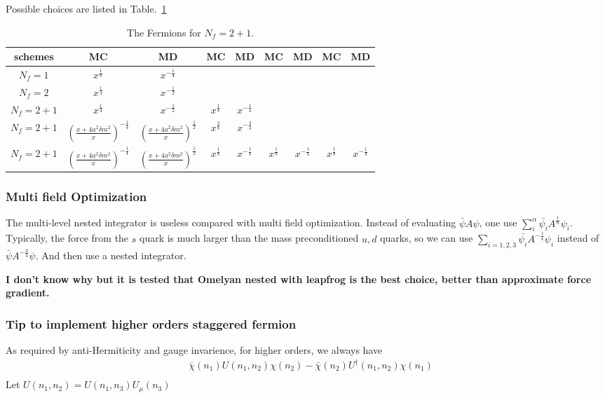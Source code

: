 Possible choices are listed in Table.~\ref{table:nf2p1staggered}
\begin{table}[ht]
\begin{tabular}{ c || c c | c c | c c| c c}
  schemes & MC & MD & MC & MD & MC & MD & MC & MD \\
  \hline
  $N_f=1$   & $x^{\frac{1}{8}}$  & $x^{-\frac{1}{4}}$ & & & & & & \\
  $N_f=2$   & $x^{\frac{1}{4}}$  & $x^{-\frac{1}{2}}$ & & & & & & \\
  \hline  
  $N_f=2+1$ & $x^{\frac{1}{4}}$  & $x^{-\frac{1}{2}}$ & $x^{\frac{1}{8}}$ & $x^{-\frac{1}{4}}$ & & & & \\
  $N_f=2+1$ & $\left(\frac{x+4a^2\delta m^2}{x}\right)^{-\frac{1}{4}}$  & $\left(\frac{x+4a^2\delta m^2}{x}\right)^{\frac{1}{2}}$ & $x^{\frac{3}{8}}$ & $x^{-\frac{3}{4}}$ & & & & \\
  $N_f=2+1$ & $\left(\frac{x+4a^2\delta m^2}{x}\right)^{-\frac{1}{4}}$  & $\left(\frac{x+4a^2\delta m^2}{x}\right)^{\frac{1}{2}}$ & $x^{\frac{1}{8}}$ & $x^{-\frac{1}{4}}$ & $x^{\frac{1}{8}}$ & $x^{-\frac{1}{4}}$ & $x^{\frac{1}{8}}$ & $x^{-\frac{1}{4}}$ \\
  \hline
\end{tabular}
\caption{The Fermions for $N_f=2+1$.}
\label{table:nf2p1staggered}
\end{table}

\subsubsection{\label{sec:multifieldOptimization}Multi field Optimization}

The multi-level nested integrator is useless compared with multi field optimization. Instead of evaluating $\bar{\psi} A \psi$, one use $\sum _i^{\alpha} \bar{\psi _i} A^{\frac{1}{\alpha}} \psi _i$. Typically, the force from the $s$ quark is much larger than the mass preconditioned $u,d$ quarks, so we can use $\sum _{i=1,2,3} \bar{\psi _i} A^{-\frac{1}{4}} \psi _i$ instead of $\bar{\psi} A^{-\frac{3}{4}} \psi$. And then use a nested integrator.

\textbf{\textcolor[rgb]{0,0,1}{I don't know why but it is tested that Omelyan nested with leapfrog is the best choice, better than approximate force gradient.}}

\subsubsection{\label{sec:TipToImplementHigherOrdersStaggeredFermion}Tip to implement higher orders staggered fermion}

As required by anti-Hermiticity and gauge invarience, for higher orders, we always have
\begin{equation}
\begin{split}
&\bar{\chi}(n_1)U(n_1,n_2)\chi (n_2) - \bar{\chi}(n_2)U^{\dagger}(n_1,n_2)\chi (n_1)\\
\end{split}
\end{equation}
Let $U(n_1,n_2)=U(n_1,n_3)U_{\mu}(n_3)$ 